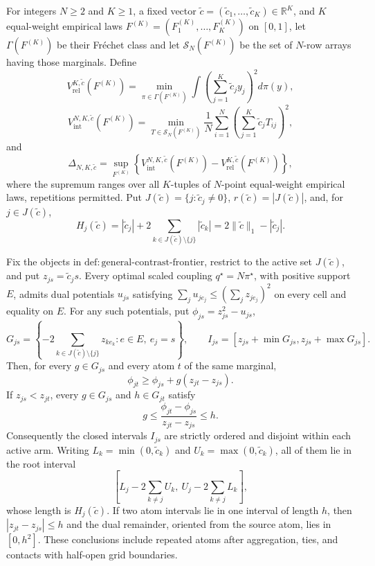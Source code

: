 For integers \(N\ge2\) and \(K\ge1\), a fixed vector \(\widetilde c=(\widetilde c_1,\ldots,\widetilde c_K)\in\mathbb R^K\), and \(K\) equal-weight empirical laws \(F^{(K)}=(F^{(K)}_1,\ldots,F^{(K)}_K)\) on \([0,1]\), let \(\Gamma(F^{(K)})\) be their Fr\'{e}chet class and let \(\mathcal S_N(F^{(K)})\) be the set of \(N\)-row arrays having those marginals.  Define
\[
 V_{\mathrm{rel}}^{K,\widetilde c}(F^{(K)})
 =\min_{\pi\in\Gamma(F^{(K)})}
 \int\left(\sum_{j=1}^K\widetilde c_jy_j\right)^2d\pi(y),
\]
\[
 V_{\mathrm{int}}^{N,K,\widetilde c}(F^{(K)})
 =\min_{T\in\mathcal S_N(F^{(K)})}
 \frac1N\sum_{i=1}^N\left(\sum_{j=1}^K\widetilde c_jT_{ij}\right)^2,
\]
and
\[
 \Delta_{N,K,\widetilde c}
 =\sup_{F^{(K)}}\left\{
 V_{\mathrm{int}}^{N,K,\widetilde c}(F^{(K)})-
 V_{\mathrm{rel}}^{K,\widetilde c}(F^{(K)})\right\},
\]
where the supremum ranges over all \(K\)-tuples of \(N\)-point equal-weight empirical laws, repetitions permitted.  Put \(J(\widetilde c)=\{j:\widetilde c_j\ne0\}\), \(r(\widetilde c)=|J(\widetilde c)|\), and, for \(j\in J(\widetilde c)\),
\[
 H_j(\widetilde c)=|\widetilde c_j|+2\sum_{k\in J(\widetilde c)\setminus\{j\}}|\widetilde c_k|
 =2\|\widetilde c\|_1-|\widetilde c_j|.
\]

Fix the objects in \(\mathrm{def{:}general\mbox{-}contrast\mbox{-}frontier}\), restrict to the active set \(J(\widetilde c)\), and put \(z_{js}=\widetilde c_js\).  Every optimal scaled coupling \(q^\star=N\pi^\star\), with positive support \(E\), admits dual potentials \(u_{js}\) satisfying \(\sum_ju_{je_j}\le(\sum_jz_{je_j})^2\) on every cell and equality on \(E\).  For any such potentials, put \(\phi_{js}=z_{js}^2-u_{js}\),
\[
 G_{js}=\left\{-2\sum_{k\in J(\widetilde c)\setminus\{j\}}z_{ke_k}:e\in E,\ e_j=s\right\},
 \qquad I_{js}=[z_{js}+\min G_{js},z_{js}+\max G_{js}].
\]
Then, for every \(g\in G_{js}\) and every atom \(t\) of the same marginal,
\[
 \phi_{jt}\ge\phi_{js}+g(z_{jt}-z_{js}).
\]
If \(z_{js}<z_{jt}\), every \(g\in G_{js}\) and \(h\in G_{jt}\) satisfy
\[
 g\le\frac{\phi_{jt}-\phi_{js}}{z_{jt}-z_{js}}\le h.
\]
Consequently the closed intervals \(I_{js}\) are strictly ordered and disjoint within each active arm.  Writing \(L_k=\min(0,\widetilde c_k)\) and \(U_k=\max(0,\widetilde c_k)\), all of them lie in the root interval
\[
 \left[L_j-2\sum_{k\ne j}U_k,\ U_j-2\sum_{k\ne j}L_k\right],
\]
whose length is \(H_j(\widetilde c)\).  If two atom intervals lie in one interval of length \(h\), then \(|z_{jt}-z_{js}|\le h\) and the dual remainder, oriented from the source atom, lies in \([0,h^2]\).  These conclusions include repeated atoms after aggregation, ties, and contacts with half-open grid boundaries.

